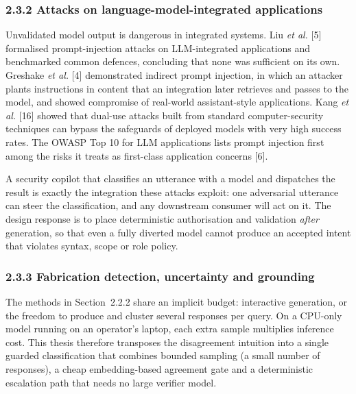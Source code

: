 \documentclass[
]{article}
\begin{document}
\hypertarget{attacks-on-language-model-integrated-applications}{%
\subsubsection{2.3.2 Attacks on language-model-integrated
applications}\label{attacks-on-language-model-integrated-applications}}

Unvalidated model output is dangerous in integrated systems. Liu
\emph{et al.} {[}5{]} formalised prompt-injection attacks on
LLM-integrated applications and benchmarked common defences, concluding
that none was sufficient on its own. Greshake \emph{et al.} {[}4{]}
demonstrated indirect prompt injection, in which an attacker plants
instructions in content that an integration later retrieves and passes
to the model, and showed compromise of real-world assistant-style
applications. Kang \emph{et al.} {[}16{]} showed that dual-use attacks
built from standard computer-security techniques can bypass the
safeguards of deployed models with very high success rates. The OWASP
Top 10 for LLM applications lists prompt injection first among the risks
it treats as first-class application concerns {[}6{]}.

A security copilot that classifies an utterance with a model and
dispatches the result is exactly the integration these attacks exploit:
one adversarial utterance can steer the classification, and any
downstream consumer will act on it. The design response is to place
deterministic authorisation and validation \emph{after} generation, so
that even a fully diverted model cannot produce an accepted intent that
violates syntax, scope or role policy.

\hypertarget{fabrication-detection-uncertainty-and-grounding}{%
\subsubsection{2.3.3 Fabrication detection, uncertainty and
grounding}\label{fabrication-detection-uncertainty-and-grounding}}

The methods in Section~2.2.2 share an implicit budget: interactive
generation, or the freedom to produce and cluster several responses per
query. On a CPU-only model running on an operator's laptop, each extra
sample multiplies inference cost. This thesis therefore transposes the
disagreement intuition into a single guarded classification that
combines bounded sampling (a small number of responses), a cheap
embedding-based agreement gate and a deterministic escalation path that
needs no large verifier model.
\end{document}
